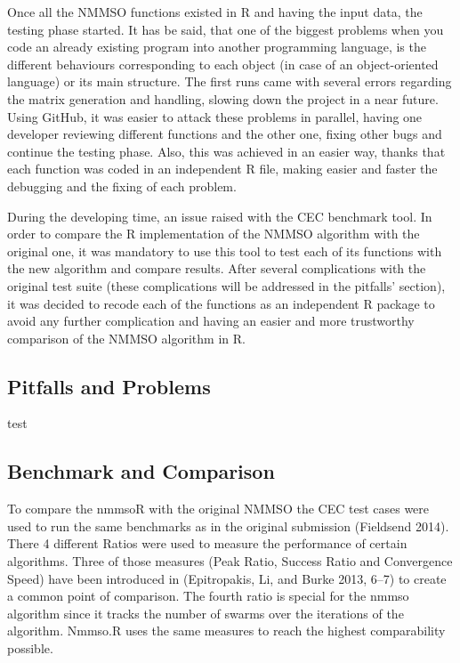 \documentclass[12pt,a4paper]{article}
\begin{document}
Once all the NMMSO functions existed in R and having the input data, the
testing phase started. It has be said, that one of the biggest problems
when you code an already existing program into another programming
language, is the different behaviours corresponding to each object (in
case of an object-oriented language) or its main structure. The first
runs came with several errors regarding the matrix generation and
handling, slowing down the project in a near future. Using GitHub, it
was easier to attack these problems in parallel, having one developer
reviewing different functions and the other one, fixing other bugs and
continue the testing phase. Also, this was achieved in an easier way,
thanks that each function was coded in an independent R file, making
easier and faster the debugging and the fixing of each problem.

During the developing time, an issue raised with the CEC benchmark tool.
In order to compare the R implementation of the NMMSO algorithm with the
original one, it was mandatory to use this tool to test each of its
functions with the new algorithm and compare results. After several
complications with the original test suite (these complications will be
addressed in the pitfalls' section), it was decided to recode each of
the functions as an independent R package to avoid any further
complication and having an easier and more trustworthy comparison of the
NMMSO algorithm in R.

\subsection{Pitfalls and Problems}\label{pitfalls-and-problems}

test

\subsection{Benchmark and Comparison}\label{benchmark-and-comparison}

To compare the nmmsoR with the original NMMSO the CEC test cases were
used to run the same benchmarks as in the original submission (Fieldsend
2014). There 4 different Ratios were used to measure the performance of
certain algorithms. Three of those measures (Peak Ratio, Success Ratio
and Convergence Speed) have been introduced in (Epitropakis, Li, and
Burke 2013, 6--7) to create a common point of comparison. The fourth
ratio is special for the nmmso algorithm since it tracks the number of
swarms over the iterations of the algorithm. Nmmso.R uses the same
measures to reach the highest comparability possible.
\end{document}
